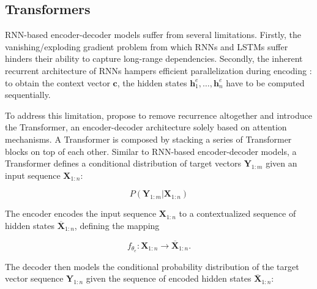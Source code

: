\subsection{Transformers}

\ac{RNN}-based encoder-decoder models suffer from several limitations. Firstly, the vanishing/exploding gradient problem from which \acp{RNN} and \acp{LSTM} suffer hinders their ability to capture long-range dependencies. Secondly, the inherent recurrent architecture of \acp{RNN} hampers efficient parallelization during encoding \citep{vaswani2017attention}: to obtain the context vector $\bm{c}$, the hidden states $\bm{h}^e_1, \ldots, \bm{h}^e_n$ have to be computed sequentially.


To address this limitation, \citet{vaswani2017attention} propose to remove recurrence altogether and introduce the Transformer, an encoder-decoder architecture solely based on attention mechanisms. A Transformer is composed by stacking a series of Transformer blocks on top of each other. Similar to \ac{RNN}-based encoder-decoder models, a Transformer defines a conditional distribution of target vectors $\bm{Y}_{1:m}$ given an input sequence $\bm{X}_{1:n}$:

\begin{equation}
    P(\bm{Y}_{1:m} | \bm{X}_{1:n})
\end{equation}

The encoder encodes the input sequence $\bm{X}_{1:n}$ to a contextualized sequence of hidden states $\bm{\overline{X}}_{1:n}$, defining the mapping

\begin{equation}
    f_{\theta_e}: \bm{X}_{1:n} \rightarrow \bm{\overline{X}}_{1:n}.
\end{equation}

The decoder then models the conditional probability distribution of the target vector sequence $\bm{Y}_{1:n}$ given the sequence of encoded hidden states $\bm{\overline{X}}_{1:n}$:

